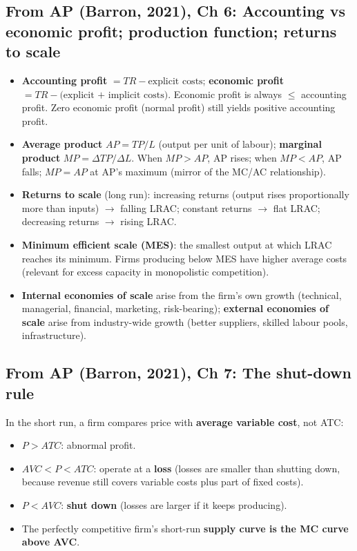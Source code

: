 \documentclass[a4paper,12pt]{article}
\newcommand{\needbold}[1]{\textcolor{red!70!black}{\textbf{#1}}}
\begin{document}
\subsection*{From AP (Barron, 2021), Ch 6: Accounting vs economic profit; production function; returns to scale}\label{sec:add-costs}
\begin{itemize}
  \item \needbold{Accounting profit} $= TR - \text{explicit costs}$; \needbold{economic profit} $= TR - \text{(explicit + implicit costs)}$. Economic profit is always $\leq$ accounting profit. Zero economic profit (normal profit) still yields positive accounting profit.
  \item \needbold{Average product} $AP = TP/L$ (output per unit of labour); \needbold{marginal product} $MP = \Delta TP/\Delta L$. When $MP > AP$, AP rises; when $MP < AP$, AP falls; $MP = AP$ at AP's maximum (mirror of the MC/AC relationship).
  \item \needbold{Returns to scale} (long run): increasing returns (output rises proportionally more than inputs) $\to$ falling LRAC; constant returns $\to$ flat LRAC; decreasing returns $\to$ rising LRAC.
  \item \needbold{Minimum efficient scale (MES)}: the smallest output at which LRAC reaches its minimum. Firms producing below MES have higher average costs (relevant for excess capacity in monopolistic competition).
  \item \needbold{Internal economies of scale} arise from the firm's own growth (technical, managerial, financial, marketing, risk-bearing); \needbold{external economies of scale} arise from industry-wide growth (better suppliers, skilled labour pools, infrastructure).
\end{itemize}

\subsection*{From AP (Barron, 2021), Ch 7: The shut-down rule}
In the short run, a firm compares price with \textbf{average variable cost}, not ATC:
\begin{itemize}
  \item $P > ATC$: abnormal profit.
  \item $AVC < P < ATC$: operate at a \textbf{loss} (losses are smaller than shutting down, because revenue still covers variable costs plus part of fixed costs).
  \item $P < AVC$: \textbf{shut down} (losses are larger if it keeps producing).
  \item The perfectly competitive firm's short-run \textbf{supply curve is the MC curve above AVC}.
\end{itemize}
\end{document}
